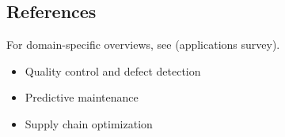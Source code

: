 
\subsection{References}

For domain-specific overviews, see \textcite{Prince2023} (applications survey).
\begin{itemize}
    \item Quality control and defect detection
    \item Predictive maintenance
    \item Supply chain optimization
\end{itemize}

